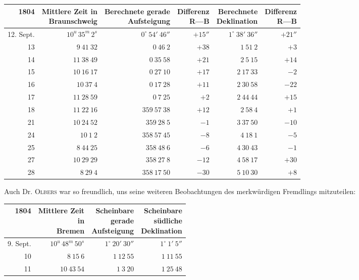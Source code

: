 \begin{center}
\begingroup\fontsize{8}{10}\selectfont\setlength{\tabcolsep}{3pt}\renewcommand{\arraystretch}{1.12}
\begin{tabular}{r|r|r|r|r|r}
1804 & \shortstack{Mittlere Zeit in\\Braunschweig} & \shortstack{Berechnete gerade\\Aufsteigung} & \shortstack{Differenz\\R—B} & \shortstack{Berechnete\\Deklination} & \shortstack{Differenz\\R—B} \\ \hline
12. Sept. & $10^{u}\,35^{m}\,2^{s}$ & $0^\circ\ 54'\ 46''$ & $+15''$ & $1^\circ\ 38'\ 36''$ & $+21''$ \\
13 & $9\ 41\ 32$ & $0\ 46\ 2$ & $+38$ & $1\ 51\ 2$ & $+3$ \\
14 & $11\ 38\ 49$ & $0\ 35\ 58$ & $+21$ & $2\ 5\ 15$ & $+14$ \\
15 & $10\ 16\ 17$ & $0\ 27\ 10$ & $+17$ & $2\ 17\ 33$ & $-2$ \\
16 & $10\ 37\ 4$ & $0\ 17\ 28$ & $+11$ & $2\ 30\ 58$ & $-22$ \\
17 & $11\ 28\ 59$ & $0\ 7\ 25$ & $+2$ & $2\ 44\ 44$ & $+15$ \\
18 & $11\ 22\ 16$ & $359\ 57\ 38$ & $+12$ & $2\ 58\ 4$ & $+1$ \\
21 & $10\ 24\ 52$ & $359\ 28\ 5$ & $-1$ & $3\ 37\ 50$ & $-10$ \\
24 & $10\ 1\ 2$ & $358\ 57\ 45$ & $-8$ & $4\ 18\ 1$ & $-5$ \\
25 & $8\ 44\ 25$ & $358\ 48\ 6$ & $-6$ & $4\ 30\ 43$ & $-1$ \\
27 & $10\ 29\ 29$ & $358\ 27\ 8$ & $-12$ & $4\ 58\ 17$ & $+30$ \\
28 & $8\ 29\ 4$ & $358\ 17\ 50$ & $-30$ & $5\ 10\ 30$ & $+8$ \\
\end{tabular}\endgroup
\end{center}

Auch Dr. \textsc{Olbers} war so freundlich, uns seine weiteren Beobachtungen des merkwürdigen Fremdlings mitzuteilen:

\begin{center}
\begingroup\fontsize{9}{11}\selectfont\setlength{\tabcolsep}{3pt}\renewcommand{\arraystretch}{1.12}
\begin{tabular}{r|r|r|r}
1804 & \shortstack{Mittlere Zeit\\in\\Bremen} & \shortstack{Scheinbare\\gerade\\Aufsteigung} & \shortstack{Scheinbare\\südliche\\Deklination} \\ \hline
9. Sept. & $10^{u}\,48^{m}\,50^{s}$ & $1^\circ\ 20'\ 30''$ & $1^\circ\ 1'\ 5''$ \\
10 & $8\ 15\ 6$ & $1\ 12\ 55$ & $1\ 11\ 55$ \\
11 & $10\ 43\ 54$ & $1\ 3\ 20$ & $1\ 25\ 48$ \\
\end{tabular}\endgroup
\end{center}

